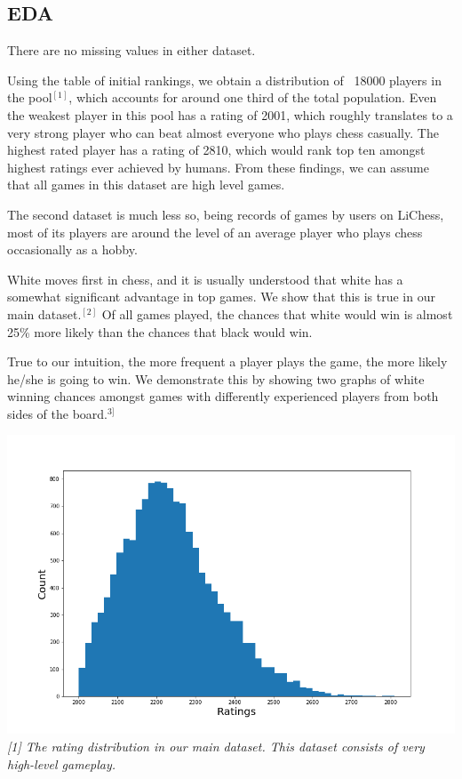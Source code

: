 \documentclass[12pt, letterpaper]{article}
\begin{document}
\begin{multicols}{2}
\subsection*{EDA}

There are no missing values in either dataset. 

Using the table of initial rankings, we obtain a distribution of ~18000 players in the pool$^{[1]}$, which accounts for around one third of the total population. Even the weakest player in this pool has a rating of 2001, which roughly translates to a very strong player who can beat almost everyone who plays chess casually. The highest rated player has a rating of 2810, which would rank top ten amongst highest ratings ever achieved by humans. From these findings, we can assume that all games in this dataset are high level games.




The second dataset is much less so, being records of games by users on LiChess, most of its players are around the level of an average player who plays chess occasionally as a hobby.

White moves first in chess, and it is usually understood that white has a somewhat significant advantage in top games. We show that this is true in our main dataset.$^{[2]}$ Of all games played, the chances that white would win is almost 25\% more likely than the chances that black would win.

True to our intuition, the more frequent a player plays the game, the more likely he/she is going to win. We demonstrate this by showing two graphs of white winning chances amongst games with differently experienced players from both sides of the board.$^{3]}$

\setlength{\parskip}{0.0cm}
\begin{center}
\begin{small}
\includegraphics[width=\linewidth]{../figures/LiChessFigs/ratings_hist.png}
\textit{[1] The rating distribution in our main dataset. This dataset consists of very high-level gameplay.}
\end{small}
\end{center}


\end{multicols}
\end{document}
